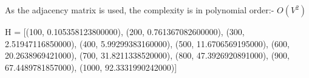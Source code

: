 \documentclass{article}
\begin{document}
As the adjacency matrix is used, the complexity is in polynomial order:- $O(V^{2})$ \\

\begin{sagesilent}
H = [(100, 0.105358123800000),
 (200, 0.761367082600000),
 (300, 2.51947116850000),
 (400, 5.99299383160000),
 (500, 11.6706569195000),
 (600, 20.2638969421000),
 (700, 31.8211338520000),
 (800, 47.3926920891000),
 (900, 67.4489781857000),
 (1000, 92.3331990242000)]
\end{sagesilent}

\begin{flushleft}
\end{flushleft}


\begin{flushleft}
\end{flushleft}
\end{document}
